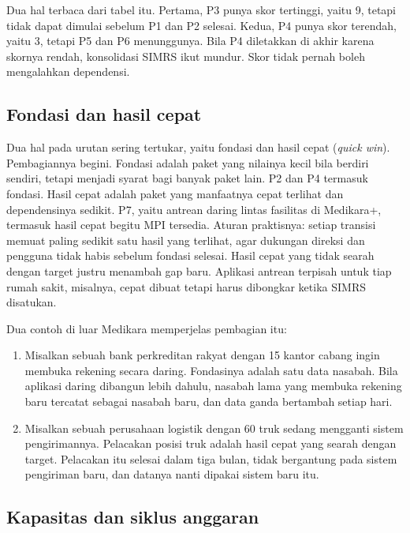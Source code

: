 Dua hal terbaca dari tabel itu. Pertama, P3 punya skor tertinggi, yaitu 9,
tetapi tidak dapat dimulai sebelum P1 dan P2 selesai. Kedua, P4 punya skor
terendah, yaitu 3, tetapi P5 dan P6 menunggunya. Bila P4 diletakkan di akhir
karena skornya rendah, konsolidasi SIMRS ikut mundur. Skor tidak pernah boleh
mengalahkan dependensi.

\subsection*{Fondasi dan hasil cepat}

Dua hal pada urutan sering tertukar, yaitu fondasi dan hasil cepat
(\textit{quick win}). Pembagiannya begini. Fondasi adalah paket yang nilainya
kecil bila berdiri sendiri, tetapi menjadi syarat bagi banyak paket lain. P2 dan
P4 termasuk fondasi. Hasil cepat adalah paket yang manfaatnya cepat terlihat
dan dependensinya sedikit. P7, yaitu antrean daring lintas fasilitas di
Medikara+, termasuk hasil cepat begitu MPI tersedia. Aturan praktisnya: setiap
transisi memuat paling sedikit satu hasil yang terlihat, agar dukungan direksi
dan pengguna tidak habis sebelum fondasi selesai. Hasil cepat yang tidak searah
dengan target justru menambah gap baru. Aplikasi antrean terpisah untuk tiap
rumah sakit, misalnya, cepat dibuat tetapi harus dibongkar ketika SIMRS
disatukan.

Dua contoh di luar Medikara memperjelas pembagian itu:

\begin{enumerate}
  \item Misalkan sebuah bank perkreditan rakyat dengan 15 kantor cabang ingin
        membuka rekening secara daring. Fondasinya adalah satu data nasabah.
        Bila aplikasi daring dibangun lebih dahulu, nasabah lama yang membuka
        rekening baru tercatat sebagai nasabah baru, dan data ganda bertambah
        setiap hari.
  \item Misalkan sebuah perusahaan logistik dengan 60 truk sedang mengganti
        sistem pengirimannya. Pelacakan posisi truk adalah hasil cepat yang
        searah dengan target. Pelacakan itu selesai dalam tiga bulan, tidak
        bergantung pada sistem pengiriman baru, dan datanya nanti dipakai
        sistem baru itu.
\end{enumerate}

\subsection*{Kapasitas dan siklus anggaran}

